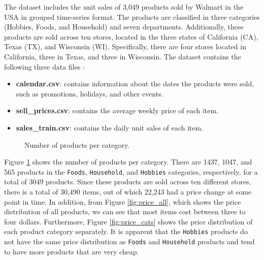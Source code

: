The dataset \cite{dataset} includes the unit sales of 3,049 products sold by Walmart in the USA in grouped time-series format. 
The products are classified in three categories (Hobbies, Foods, and Household) and seven departments. 
Additionally, these products are sold across ten stores, located in the three states of California (CA), Texas (TX), and Wisconsin (WI). Specifically, there are four stores located in California, three in Texas, and three in Wisconsin.
The dataset contains the following three data files \cite{m5}:
\begin{itemize}
    \item \textbf{calendar.csv}: contains information about the dates the products were sold, such as promotions, holidays, and other events.
    \item \textbf{sell\_prices.csv}: contains the average weekly price of each item.
    \item \textbf{sales\_train.csv}: contains the daily unit sales of each item.
\end{itemize}

\begin{figure}
    \vspace{-25pt}
    \centering
    \captionsetup{width=.46\textwidth}
    \caption{Number of products per category.}
    \label{fig:item_cats}
    \vspace{-20pt}
\end{figure}

Figure \ref{fig:item_cats} shows the number of products per category. 
There are 1437, 1047, and 565 products in the \texttt{Foods}, \texttt{Household}, and \texttt{Hobbies} categories, respectively, for a total of 3049 products. 
Since these products are sold across ten different stores, there is a total of 30,490 items, out of which 22,243 had a price change at some point in time. 
In addition, from Figure \ref{fig:price_all}, which shows the price distribution of all products, we can see that most items cost between three to four dollars.
Furthermore, Figure \ref{fig:price_cats} shows the price distribution of each product category separately.
It is apparent that the \texttt{Hobbies} products do not have the same price distribution as \texttt{Foods} and \texttt{Household} products and tend to have more products that are very cheap.

